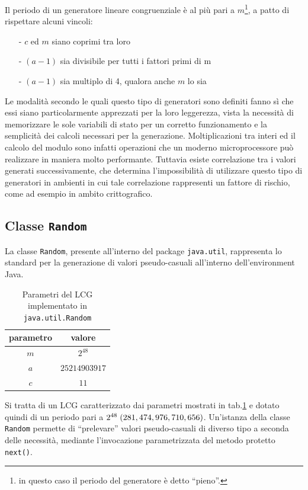 Il periodo di un generatore lineare congruenziale \`e al pi\`u pari a $m$\footnote{in questo caso il periodo del generatore \`e detto ``pieno''.}, a patto di rispettare alcuni vincoli:
\begin{itemize}
\item[-] $c$ ed $m$ siano coprimi tra loro
\item[-] $(a-1)$ sia divisibile per tutti i fattori primi di m
\item[-] $(a-1)$ sia multiplo di 4, qualora anche $m$ lo sia
\end{itemize}

Le modalit\`a secondo le quali questo tipo di generatori sono definiti fanno s\`i che essi siano particolarmente apprezzati per la loro leggerezza, vista la necessit\`a di memorizzare le sole variabili di stato per un corretto funzionamento e la semplicit\`a dei calcoli necessari per la generazione. Moltiplicazioni tra interi ed il calcolo del modulo sono infatti operazioni che un moderno microprocessore pu\`o realizzare in maniera molto performante.
Tuttavia esiste correlazione tra i valori generati successivamente, che determina l'impossibilit\`a di utilizzare questo tipo di generatori in ambienti in cui tale correlazione rappresenti un fattore di rischio, come ad esempio in ambito crittografico.

\subsection{Classe {\tt Random}}
\label{sec:rndjava}
La classe {\tt Random}, presente all'interno del package {\tt java.util}, rappresenta lo standard per la generazione di valori pseudo-casuali all'interno dell'environment Java.


\begin{table}[!h]
	\begin{center}
	\begin{tabular}{c|c}
	parametro & valore\\
	\hline
	$m$ & $2^{48}$  \\
	$a$ & $25214903917$  \\
	$c$ & $11$  \\
	\end{tabular}
	\end{center}
	\caption{Parametri del LCG implementato in {\tt java.util.Random}}
	\label{tab:rndjava}
\end{table}

Si tratta di un LCG caratterizzato dai parametri mostrati in tab.\ref{tab:rndjava}
e dotato quindi di un periodo pari a  $2^{48} \thickspace (281,474,976,710,656)$.
Un'istanza della classe {\tt Random} permette di ``prelevare'' valori pseudo-casuali di diverso tipo a seconda delle necessit\`a, mediante l'invocazione parametrizzata del metodo protetto {\tt next()}.

